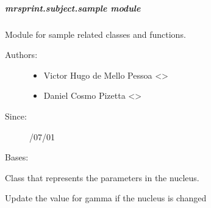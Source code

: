 \documentclass[a4paper,10pt,english]{sphinxmanual}
\begin{document}
\subparagraph{mrsprint.subject.sample module}
\label{\detokenize{autodoc/mrsprint/mrsprint.subject:module-mrsprint.subject.sample}}\label{\detokenize{autodoc/mrsprint/mrsprint.subject:mrsprint-subject-sample-module}}
Module for sample related classes and functions.
\begin{description}
\item[{Authors:}] \leavevmode\begin{itemize}
\item {} 
Victor Hugo de Mello Pessoa \textless{}\textgreater{}

\item {} 
Daniel Cosmo Pizetta \textless{}\textgreater{}

\end{itemize}

\item[{Since:}] /07/01

\end{description}

\begin{fulllineitems}
\label{\detokenize{autodoc/mrsprint/mrsprint.subject:mrsprint.subject.sample.Nucleus}}
Bases: 

Class that represents the parameters in the nucleus.

\begin{fulllineitems}
\label{\detokenize{autodoc/mrsprint/mrsprint.subject:mrsprint.subject.sample.Nucleus.updateGamma}}
Update the value for gamma if the nucleus is changed

\end{fulllineitems}


\end{fulllineitems}

\end{document}
